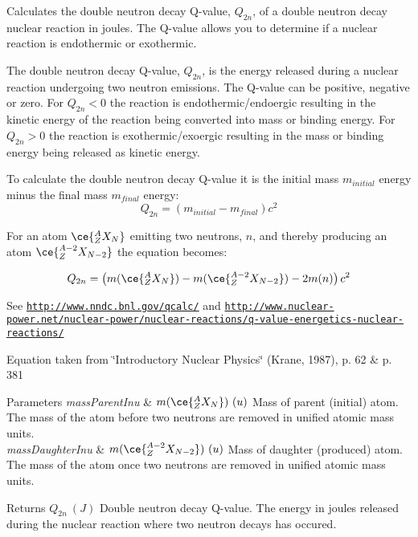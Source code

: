 Calculates the double neutron decay Q-\/value, $Q_{2n}$, of a double neutron decay nuclear reaction in joules. The Q-\/value allows you to determine if a nuclear reaction is endothermic or exothermic. 

The double neutron decay Q-\/value, $Q_{2n}$, is the energy released during a nuclear reaction undergoing two neutron emissions. The Q-\/value can be positive, negative or zero. For $Q_{2n} < 0$ the reaction is endothermic/endoergic resulting in the kinetic energy of the reaction being converted into mass or binding energy. For $Q_{2n} > 0$ the reaction is exothermic/exoergic resulting in the mass or binding energy being released as kinetic energy.

To calculate the double neutron decay Q-\/value it is the initial mass $m_{initial}$ energy minus the final mass $m_{final}$ energy\+: \[Q_{2n} = \left ( m_{initial}-m_{final}\right ) c^2\]

For an atom $\ce{ ^{A}_{Z}X_{N} }$ emitting two neutrons, $n$, and thereby producing an atom $\ce{ ^{A-2}_{Z}X_{N-2} }$ the equation becomes\+:

\[Q_{2n} = \left ( m(\ce{ ^{A}_{Z}X_{N} }) - m(\ce{ ^{A-2}_{Z}X_{N-2} }) - 2m(n) \right ) c^2\]

See \href{http://www.nndc.bnl.gov/qcalc/}{\tt http\+://www.\+nndc.\+bnl.\+gov/qcalc/} and \href{http://www.nuclear-power.net/nuclear-power/nuclear-reactions/q-value-energetics-nuclear-reactions/}{\tt http\+://www.\+nuclear-\/power.\+net/nuclear-\/power/nuclear-\/reactions/q-\/value-\/energetics-\/nuclear-\/reactions/}

Equation taken from \char`\"{}\+Introductory Nuclear Physics\char`\"{} (Krane, 1987), p. 62 \& p. 381


\begin{DoxyParams}{Parameters}
{\em mass\+Parent\+Inu} & $m(\ce{ ^{A}_{Z}X_{N} })\ (u)$ Mass of parent (initial) atom. The mass of the atom before two neutrons are removed in unified atomic mass units. \\
\hline
{\em mass\+Daughter\+Inu} & $m(\ce{ ^{A-2}_{Z}X_{N-2} })\ (u)$ Mass of daughter (produced) atom. The mass of the atom once two neutrons are removed in unified atomic mass units. \\
\hline
\end{DoxyParams}
\begin{DoxyReturn}{Returns}
$Q_{2n}\ (J)$ Double neutron decay Q-\/value. The energy in joules released during the nuclear reaction where two neutron decays has occured. 
\end{DoxyReturn}
\mbox{\label{group___e_g_x_phys-_q_value_ga6bfea723aca78b32ea67cc1ca7b4031b}} 
